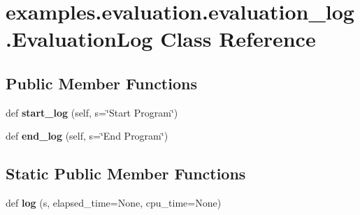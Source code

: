 \hypertarget{classexamples_1_1evaluation_1_1evaluation__log_1_1_evaluation_log}{}\section{examples.\+evaluation.\+evaluation\+\_\+log.\+Evaluation\+Log Class Reference}
\label{classexamples_1_1evaluation_1_1evaluation__log_1_1_evaluation_log}
\subsection*{Public Member Functions}
\begin{DoxyCompactItemize}
\item 
\mbox{\label{classexamples_1_1evaluation_1_1evaluation__log_1_1_evaluation_log_a9567288a503754edec02e2e6c1d1e8cb}} 
def {\bfseries start\+\_\+log} (self, s=\char`\"{}Start Program\char`\"{})
\item 
\mbox{\label{classexamples_1_1evaluation_1_1evaluation__log_1_1_evaluation_log_ab47ae238d9981e79f0fb03218970c141}} 
def {\bfseries end\+\_\+log} (self, s=\char`\"{}End Program\char`\"{})
\end{DoxyCompactItemize}
\subsection*{Static Public Member Functions}
\begin{DoxyCompactItemize}
\item 
\mbox{\label{classexamples_1_1evaluation_1_1evaluation__log_1_1_evaluation_log_a078884c4de3cdfd095e7aa6701f0f5fa}} 
def {\bfseries log} (s, elapsed\+\_\+time=None, cpu\+\_\+time=None)
\end{DoxyCompactItemize}
